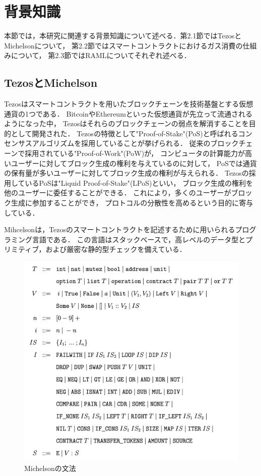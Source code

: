 \documentclass{kuisthesis}
\begin{document}
\section{背景知識}\label{sec-preliminary}
本節では，本研究に関連する背景知識について述べる．第2.1節ではTezosとMichelsonについて，
第2.2節ではスマートコントラクトにおけるガス消費の仕組みについて，
第2.3節ではRAMLについてそれぞれ述べる．

\subsection{TezosとMichelson}\label{subsec-pre-tezos}
Tezosはスマートコントラクトを用いたブロックチェーンを技術基盤とする仮想通貨の1つである．
BitcoinやEthereumといった仮想通貨が先立って流通されるようになった中，
Tezosはそれらのブロックチェーンの弱点を解消することを目的として開発された．
Tezosの特徴として"Proof-of-Stake"(PoS)と呼ばれるコンセンサスアルゴリズムを採用していることが挙げられる．
従来のブロックチェーンで採用されている"Proof-of-Work"(PoW)が，
コンピュータの計算能力が高いユーザーに対してブロック生成の権利を与えているのに対して，
PoSでは通貨の保有量が多いユーザーに対してブロック生成の権利が与えられる．
Tezosの採用しているPoSは"Liquid Proof-of-Stake"(LPoS)といい，
ブロック生成の権利を他のユーザーに委任することができる．
これにより，多くのユーザーがブロック生成に参加することができ，
プロトコルの分散性を高めるという目的に寄与している．

Mihcelsonは，Tezosのスマートコントラクトを記述するために用いられるプログラミング言語である．
この言語はスタックベースで，高レベルのデータ型とプリミティブ，および厳密な静的型チェックを備えている\cite{michelson}．


\begin{figure}[ht]
  \begin{center}
    \includegraphics[scale=0.75]{image1.png}
    \caption{Michelsonの文法}
    \label{image1}
  \end{center}
\end{figure}
\end{document}
